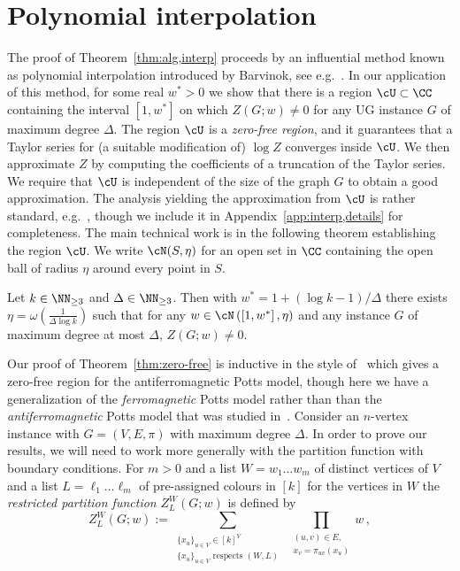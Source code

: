 \section{Polynomial interpolation}\label{sec:interp}
%
The proof of Theorem~\ref{thm:alg,interp} proceeds by an influential method known as polynomial interpolation introduced by Barvinok, see e.g.~\cite{Barvinok16}. 
In our application of this method, for some real $w^*>0$ we show that there is a region $\cU\subset\CC$ containing the interval $[1,w^*]$ on which $Z(G;w)\ne0$ for any UG instance $G$ of maximum degree $\Delta$. 
The region $\cU$ is a \emph{zero-free region}, and it guarantees that a Taylor series for (a suitable modification of) $\log Z$ converges inside $\cU$.
We then approximate $Z$ by computing the coefficients of a truncation of the Taylor series.
We require that $\cU$ is independent of the size of the graph $G$ to obtain a good approximation. 
The analysis yielding the approximation from $\cU$ is rather standard, e.g.~\cite{Barvinok16,Barvinok18,PR17}, though we include it in Appendix~\ref{app:interp,details} for completeness. The main technical work is in the following theorem establishing the region $\cU$. 
We write $\cN(S, \eta)$ for an open set in $\CC$ containing the open ball of radius $\eta$ around every point in $S$.
%
\begin{theorem}\label{thm:zero-free}
Let $k\in\NN_{\geq 3}$ and $\Delta\in \NN_{\geq 3}$.
Then with $w^*= 1+(\log k -1)/\Delta$ there exists $\eta=\omega(\frac{1}{\Delta\log k})$ such that for any $w\in \cN\left(\left[1,w^*\right],\eta\right)$ and any \UG[k] instance $G$ of maximum degree at most $\Delta$, $Z(G;w)\neq 0$.
\end{theorem}
%
%
Our proof of Theorem~\ref{thm:zero-free} is inductive in the style of~\cite{BDPR18} which gives a zero-free region for the antiferromagnetic Potts model, though here we have a generalization of the \emph{ferromagnetic} Potts model rather than than the \emph{antiferromagnetic} Potts model that was studied in~\cite{BDPR18}. 
%
%
Consider an $n$-vertex \UG[k] instance with $G=(V,E,\pi)$ with maximum degree $\Delta$.
In order to prove our results, we will need to work more generally with the partition function with boundary conditions.
For $m>0$ and a list $W=w_1\ldots w_m$ of distinct vertices of $V$ and a list $L=\ell_1\ldots\ell_m$ of pre-assigned colours in $[k]$ for the vertices in $W$ the \emph{restricted partition function} $Z^{W}_{L}(G;w)$ is defined by
\[
Z^{W}_{L}(G;w):=\sum_{\substack{\{x_u\}_{u\in V}\in[k]^V\\\{x_u\}_{u\in V} \text{ respects }(W,L)}}\;\prod_{\substack{(u,v)\in E,\\ x_v=\pi_{uv}(x_u)}}w\,,
\]
